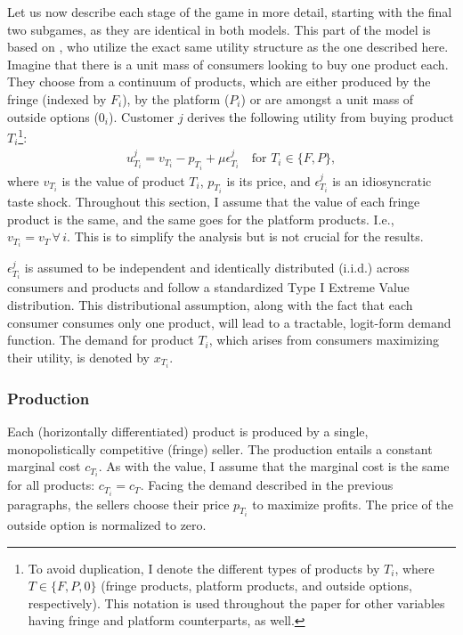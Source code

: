Let us now describe each stage of the game in more detail, starting with the final two subgames, as they are identical in both models.
This part of the model is based on \textcite[]{anderson2021hybrid}, who utilize the exact same utility structure as the one described here.
Imagine that there is a unit mass of consumers looking to buy one product each.
They choose from a continuum of products, which are either produced by the fringe (indexed by $F_i$), by the platform ($P_i$) or are amongst a unit mass of outside options ($0_i$).
Customer $j$ derives the following utility from buying product $T_i$\footnote{
 To avoid duplication, I denote the different types of products by $T_i$, where $T \in \{F, P, 0\}$ (fringe products, platform products, and outside options, respectively).
 This notation is used throughout the paper for other variables having fringe and platform counterparts, as well.
}:
\begin{align*}
 u_{T_i}^j = v_{T_i} - p_{T_i} + \mu\epsilon_{T_i}^j \quad \text{for } T_i \in \{F, P\},
\end{align*}
where $v_{T_i}$ is the value of product $T_i$, $p_{T_i}$ is its price, and $\epsilon_{T_i}^j$ is an idiosyncratic taste shock.
Throughout this section, I assume that the value of each fringe product is the same, and the same goes for the platform products.
I.e., $v_{T_i} = v_T \, \forall\,i$.
This is to simplify the analysis but is not crucial for the results.

$\epsilon_{T_i}^j$ is assumed to be independent and identically distributed (i.i.d.) across consumers and products and follow a standardized Type I Extreme Value distribution.
This distributional assumption, along with the fact that each consumer consumes only one product, will lead to a tractable, logit-form demand function.
The demand for product $T_i$, which arises from consumers maximizing their utility, is denoted by $x_{T_i}$.

\subsubsection{Production}

Each (horizontally differentiated) product is produced by a single, monopolistically competitive (fringe) seller.
The production entails a constant marginal cost $c_{T_i}$.
As with the value, I assume that the marginal cost is the same for all products: $c_{T_i} = c_T$.
Facing the demand described in the previous paragraphs, the sellers choose their price $p_{T_i}$ to maximize profits.
The price of the outside option is normalized to zero.

